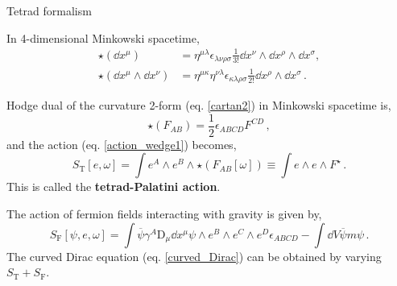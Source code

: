 \documentclass{beamer}
\newcommand\boldtext[1]{\textcolor{bolds}{\textbf{#1}}}
\begin{document}
\begin{frame}{Tetrad formalism}
    \begin{list}{\maltese}{\leftmargin=1em \itemindent=0em}
        \item<1-> In 4-dimensional Minkowski spacetime,
        \begin{align}
            \star(\dd{x^\mu})&=\eta^{\mu\lambda}\epsilon_{\lambda\nu\rho\sigma}\frac{1}{3!}\dd{x^\nu}\wedge\dd{x^\rho}\wedge\dd{x^\sigma},\\
            \star(\dd{x^\mu}\wedge\dd{x^\nu})&=\eta^{\mu\kappa}\eta^{\nu\lambda} \epsilon_{\kappa\lambda\rho\sigma}\frac{1}{2!}\dd{x^\rho}\wedge\dd{x^\sigma}\,.
        \end{align}
        \item<2-> Hodge dual of the curvature 2-form (eq. \ref{cartan2}) in Minkowski spacetime is,
        \begin{equation}
            \star(F_{AB})=\frac{1}{2}\epsilon_{ABCD}F^{CD}\,,
        \end{equation}
        and the action (eq. \ref{action_wedge1}) becomes,
        \begin{equation}
            S_\text{T}[e,\omega]=\int e^A\wedge e^B\wedge\star(F_{AB}[\omega])\equiv\int e\wedge e\wedge F^\star\,. 
        \end{equation}
        This is called the \boldtext{tetrad-Palatini action}.
        \item<3-> The action of fermion fields interacting with gravity is given by,
        \begin{equation}
            S_\text{F}[\psi,e,\omega]=\int\overline{\psi}\gamma^A\text{D}_\mu\dd{x^\mu}\psi\wedge e^B\wedge e^C\wedge e^D\epsilon_{ABCD}-\int\dd{V}\overline{\psi}m\psi\,.
        \end{equation}
        The curved Dirac equation (eq. \ref{curved_Dirac}) can be obtained by varying $S_\text{T}+S_\text{F}$.
    \end{list}
\end{frame}
\end{document}
